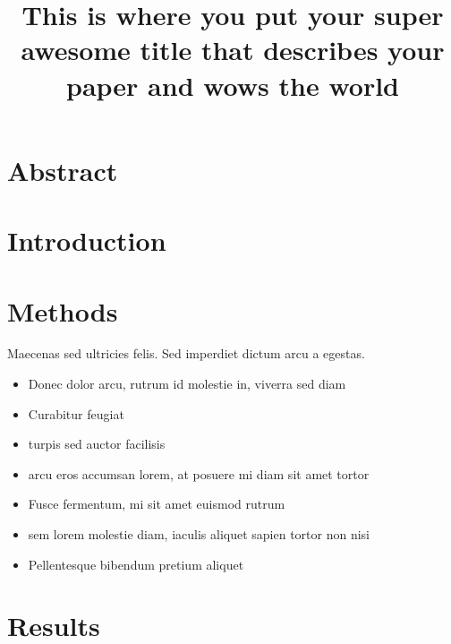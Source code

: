 \documentclass[12pt]{article}
\title{\large \textbf{This is where you put your super awesome title that describes your paper and wows the world}} %
\author{}
\date{} %
\begin{document}
\raggedright
\maketitle
\thispagestyle{empty}
\pagestyle{empty}

\section*{Abstract}

\lipsum[1] %


\section*{Introduction}

\lipsum[2-3] %


\section*{Methods}

Maecenas sed ultricies felis. Sed imperdiet dictum arcu a egestas.
\begin{itemize}
\item Donec dolor arcu, rutrum id molestie in, viverra sed diam
\item Curabitur feugiat
\item turpis sed auctor facilisis
\item arcu eros accumsan lorem, at posuere mi diam sit amet tortor
\item Fusce fermentum, mi sit amet euismod rutrum
\item sem lorem molestie diam, iaculis aliquet sapien tortor non nisi
\item Pellentesque bibendum pretium aliquet
\end{itemize} 
\lipsum[4] %


\section*{Results}
\end{document}
